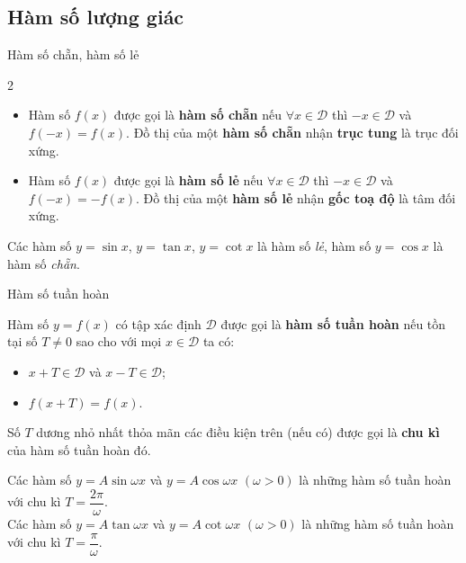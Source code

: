 \subsection{Hàm số lượng giác}
\begin{khung4}{Hàm số chẵn, hàm số lẻ}
	\begin{multicols}{2}
		\begin{itemize}
			\item Hàm số $f(x)$ được gọi là \textbf{hàm số chẵn} nếu $\forall x \in \mathscr{D}$ thì $-x \in \mathscr{D}$ và $f(-x)=f(x)$. Đồ thị của một \textbf{hàm số chẵn} nhận \textbf{trục tung} là trục đối xứng.
			\item Hàm số $f(x)$ được gọi là \textbf{hàm số lẻ} nếu $\forall x \in \mathscr{D}$ thì $-x \in \mathscr{D}$ và $f(-x)=-f(x)$. Đồ thị của một \textbf{hàm số lẻ} nhận \textbf{gốc toạ độ} là tâm đối xứng.
		\end{itemize}
	\end{multicols}
	Các hàm số $y=\sin x$, $y=\tan x$, $y=\cot x$ là hàm số \textit{lẻ}, hàm số $y=\cos x$ là hàm số \textit{chẵn}.
\end{khung4}
\begin{khung4}{Hàm số tuần hoàn}
	
		Hàm số $y=f(x)$ có tập xác định $\mathscr{D}$ được gọi là \textbf{hàm số tuần hoàn} nếu tồn tại số $T \neq 0$ sao cho với mọi $x \in \mathscr{D}$ ta có:
		\begin{itemize}
			\item $x+T \in \mathscr{D}$ và $x-T \in \mathscr{D}$;
			\item $f(x+T)=f(x)$.
		\end{itemize}
		Số $T$ dương nhỏ nhất thỏa mãn các điều kiện trên (nếu có) được gọi là \textbf{chu kì} của hàm số tuần hoàn đó.
	
	Các hàm số $y=A \sin \omega x$ và $y=A \cos \omega x$ $(\omega>0)$ là những hàm số tuần hoàn với chu kì $T=\dfrac{2 \pi}{\omega}$.\\
	Các hàm số $y=A \tan \omega x$ và $y=A \cot \omega x$ $(\omega>0)$ là những hàm số tuần hoàn với chu kì $T=\dfrac{\pi}{\omega}$.
\end{khung4}

